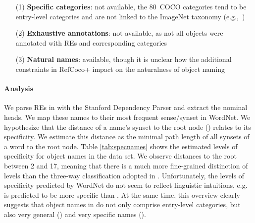 \begin{itemize}
     		\item[(1)] \textbf{Specific categories}: not available, the $80$~COCO categories tend to be entry-level categories and are not linked to the ImageNet taxonomy (e.g.,~)
		\item[(2)] \textbf{Exhaustive annotations}: not available, as not all objects were annotated with REs and corresponding categories
		   \item[(3)] \textbf{Natural names}: available, though it is unclear how the additional constraints in RefCoco+ impact on the naturalness of object naming
\end{itemize}

\paragraph{Analysis} We parse REs in  with the Stanford Dependency Parser and extract the nominal heads. We map these names to their most frequent sense/synset in WordNet.
We hypothesize that the distance of a name's synset to the root node () relates to its specificity.
We estimate this distance as the minimal path length of all synsets of a word  to the root node.
Table \ref{tab:specnames} shows the estimated levels of specificity for object names in the  data set.
We observe distances to the root between 2 and 17, meaning that there is a much more fine-grained distinction of levels than the three-way classification adopted in \cite{graf2016animal}.
Unfortunately, the levels of specificity predicted by WordNet do not seem to reflect linguistic intuitions, e.g.\  is predicted to be more specific than .
At the same time, this overview clearly suggests that object names in  do not only comprise entry-level categories, but also very general () and very specific names ().

